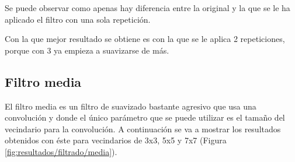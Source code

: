 Se puede observar como apenas hay diferencia entre la original y la que se le ha aplicado el filtro con una sola repetición.

Con la que mejor resultado se obtiene es con la que se le aplica 2 repeticiones, porque con 3 ya empieza a suavizarse de más.

\subsection{Filtro media}

El filtro media es un filtro de suavizado bastante agresivo que usa una convolución y donde el único parámetro que se puede utilizar es el tamaño del vecindario para la convolución. A continuación se va a mostrar los resultados obtenidos con éste para vecindarios de 3x3, 5x5 y 7x7 (Figura \ref{fig:resultados/filtrado/media}).

